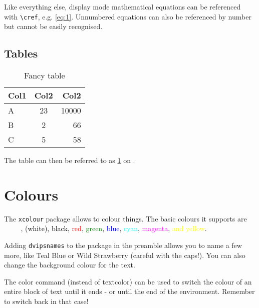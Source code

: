 \documentclass[12pt, letterpaper]{article} %
\begin{document}
Like everything else, display mode mathematical equations can be referenced 
with \verb+\cref+, e.g. \cref{eq:1}. Unnumbered equations can also be 
referenced by number but cannot be easily recognised.

\clearpage

\subsection*{Tables} %

\begin{table}[h] %
	\centering %
	\begin{tabular}{|| l | c | r ||} %
		\hline %
		Col1 &	Col2 &	Col2	\\ \hline\hline %
		A	 &	23	 &	10000	\\ \hline
		B	 &	2	 &	66		\\ \hline
		C	 &	5	 &	58 		\\ [1ex] \hline %
	\end{tabular}
	\caption{Fancy table} %
	\label{table:data} %
\end{table}

The table can then be referred to as \cref{table:data} on .

\section{Colours}

The \texttt{xcolour} package allows to colour things. 
The basic colours it supports are 
\textcolor{white}{white}, 
\textcolor{black}{(white), black}, 
\textcolor{red}{red}, 
\textcolor{green}{green}, 
\textcolor{blue}{blue}, 
\textcolor{cyan}{cyan}, 
\textcolor{magenta}{magenta}, 
\textcolor{yellow}{and yellow}.

Adding \texttt{dvipsnames} to the package in the preamble 
allows you to name a few more, like 
\textcolor{TealBlue}{Teal Blue} or 
\textcolor{WildStrawberry}{Wild Strawberry} 
(careful with the caps!). 
You can also change \colorbox{BurntOrange}{the background colour} 
for the text.

The color command (instead of textcolor) can be used 
\color{cyan}to switch the colour of an entire block of text 
until it ends - or until the end of the environment. 
Remember to \color{black} switch back in that case!
\end{document}
